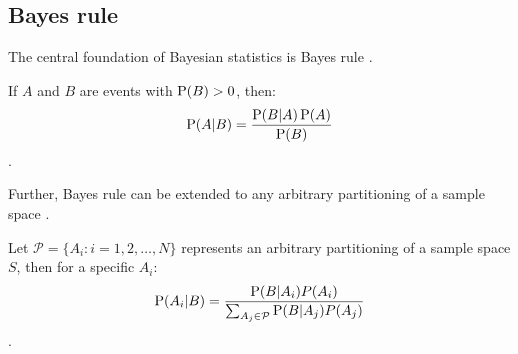 \begin{DoubleSpace*}
\section{Bayes rule}

The central foundation of Bayesian statistics is Bayes rule \cite{gelman2004}. 
\begin{theorem} If $A$ and $B$ are events with $\operatorname{P}(B)>0$, then:
	\begin{gather}
		\operatorname{P}(A|B) = \frac{\operatorname{P}(B|A)\operatorname{P}(A)}{\operatorname{P}(B)}
	\end{gather}.	
\end{theorem}

Further, Bayes rule can be extended to any arbitrary partitioning of a sample space \cite{casella2002}.
\begin{theorem}
	Let $\mathcal{P}=\{A_i: i=1,2, \hdots, N\}$ represents an arbitrary partitioning of a sample space $S$, then for a specific $A_i$:
	\begin{gather}
			 \operatorname{P}(A_i|B)=\frac{\operatorname{P}(B|A_i)P(A_i)}{\sum_{A_j\in \mathcal{P}}\operatorname{P}(B|A_j)P(A_j)}
	\end{gather}.
\end{theorem}


\end{DoubleSpace*}
